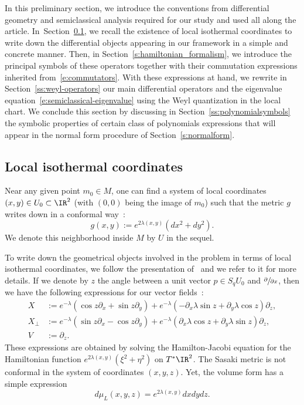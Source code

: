 \documentclass[10pt]{amsart}
\theoremstyle{plain}
\theoremstyle{definition}
\theoremstyle{remark}
\begin{document}
In this preliminary section, we introduce the conventions from differential geometry and semiclassical analysis required for our study and used all along the article. In~Sec\-tion~\ref{s:local_coordinates}, we recall the existence of local isothermal coordinates to write down the differential objects appearing in our framework in a simple and concrete manner. Then, in Section~\ref{s:hamiltonian_formalism}, we introduce the principal symbols of these operators together with their commutation expressions inherited from~\eqref{e:commutators}. With these expressions at hand, we rewrite in Section~\ref{ss:weyl-operators} our main differential operators and the eigenvalue equation~\eqref{e:semiclassical-eigenvalue} using the Weyl quantization in the local chart. We conclude this section by discussing in Section~\ref{ss:polynomialsymbols} the symbolic properties of certain class of polynomials expressions that will appear in the normal form procedure of Section~\ref{s:normalform}.

\subsection{Local isothermal coordinates}
\label{s:local_coordinates}

Near any given point $m_0\in M$, one can find a system of local coordinates $(x,y)\in U_0\subset \IR^2$ (with $(0,0)$ being the image of $m_0$) such that the metric $g$ writes down in a conformal way~\cite[Th.\,3.4.8]{PaternainSaloUhlmann22}:
\[
g(x,y):=e^{2\lambda(x,y)}(dx^2+dy^2).
\]
We denote this neighborhood inside $M$ by $U$ in the sequel.

To write down the geometrical objects involved in the problem in terms of local isothermal coordinates, we follow the presentation of~\cite[\S 3.5]{PaternainSaloUhlmann22} and we refer to it for more details. If we denote by $z$ the angle between a unit vector $p\in S_qU_0$ and $\sfrac{\partial}{\partial x}$, then we have the following expressions for our vector fields~\cite[Lem.\,3.5.6]{PaternainSaloUhlmann22}:
\begin{align*}
X&:=e^{-\lambda}(\cos z\partial_x+\sin z\partial_y)+e^{-\lambda}\left(-\partial_x\lambda\sin z +\partial_y\lambda \cos z\right)\partial_z,
\\
X_\perp&:=e^{-\lambda}(\sin z\partial_x-\cos z\partial_y)+e^{-\lambda}\left(\partial_x\lambda \cos z+\partial_y\lambda \sin z\right) \partial_z,\\
\tag*{and}
V&:= \partial_z.
\end{align*}
These expressions are obtained by solving the Hamilton-Jacobi equation for the Hamiltonian function $e^{2\lambda(x,y)}(\xi^2+\eta^2)$ on $T^*\IR^2$. The Sasaki metric is not conformal in the system of coordinates $(x,y,z)$. Yet, the volume form has a simple expression
\begin{equation}%
d\mu_{L}(x,y,z)=e^{2\lambda(x,y)}dxdydz.
\end{equation}
\end{document}
